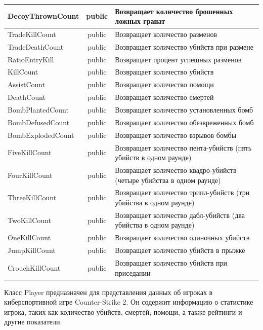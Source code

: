 \begin{xltabular}{\textwidth}{|X|c|X|}
	DecoyThrownCount & public & Возвращает количество брошенных ложных гранат \\ \hline
	TradeKillCount & public & Возвращает количество разменов \\ \hline
	TradeDeathCount & public & Возвращает количество убийств при размене \\ \hline
	RatioEntryKill & public & Возвращает процент успешных разменов \\ \hline
	KillCount & public & Возвращает количество убийств \\ \hline
	AssistCount & public & Возвращает количество помощи \\ \hline
	DeathCount & public & Возвращает количество смертей \\ \hline
	BombPlantedCount & public & Возвращает количество установленных бомб \\ \hline
	BombDefusedCount & public & Возвращает количество обезвреженных бомб \\ \hline
	BombExplodedCount & public & Возвращает количество взрывов бомбы \\ \hline
	FiveKillCount & public & Возвращает количество пента-убийств (пять убийств в одном раунде) \\ \hline
	FourKillCount & public & Возвращает количество квадро-убийств (четыре убийства в одном раунде) \\ \hline
	ThreeKillCount & public & Возвращает количество трипл-убийств (три убийства в одном раунде) \\ \hline
	TwoKillCount & public & Возвращает количество дабл-убийств (два убийства в одном раунде) \\ \hline
	OneKillCount & public & Возвращает количество одиночных убийств \\ \hline
	JumpKillCount & public & Возвращает количество убийств в прыжке \\ \hline
	CrouchKillCount & public & Возвращает количество убийств при приседании \\ \hline
\end{xltabular}

Класс Player предназначен для представления данных об игроках в киберспортивной игре Counter-Strike 2. Он содержит информацию о статистике игрока, таких как количество убийств, смертей, помощи, а также рейтинги и другие показатели.

